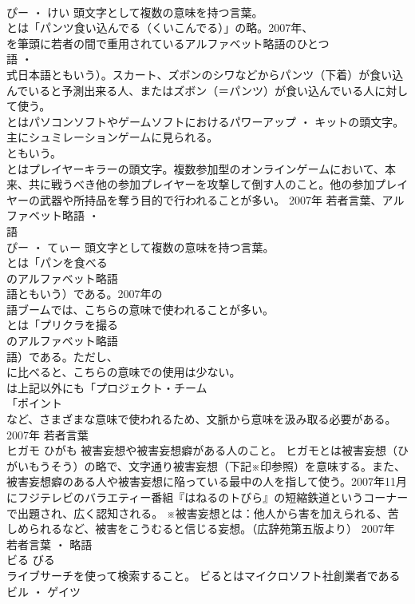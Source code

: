 \documentclass[8pt]{extreport}
\begin{document}
\begin{CJK}{UTF8}{min}
\\	ぴー ・ けい	頭文字として複数の意味を持つ言葉。	
\\	とは「パンツ食い込んでる（くいこんでる）」の略。2007年、
\\	を筆頭に若者の間で重用されているアルファベット略語のひとつ
\\	語 ・ 
\\	式日本語ともいう）。スカート、ズボンのシワなどからパンツ（下着）が食い込んでいると予測出来る人、またはズボン（＝パンツ）が食い込んでいる人に対して使う。 
\\	とはパソコンソフトやゲームソフトにおけるパワーアップ ・ キットの頭文字。主にシュミレーションゲームに見られる。
\\	ともいう。 
\\	とはプレイヤーキラーの頭文字。複数参加型のオンラインゲームにおいて、本来、共に戦うべき他の参加プレイヤーを攻撃して倒す人のこと。他の参加プレイヤーの武器や所持品を奪う目的で行われることが多い。	2007年	若者言葉、アルファベット略語 ・ 
\\	語	
\\	ぴー ・ てぃー	頭文字として複数の意味を持つ言葉。	
\\	とは「パンを食べる
\\	のアルファベット略語
\\	語ともいう）である。2007年の
\\	語ブームでは、こちらの意味で使われることが多い。 
\\	とは「プリクラを撮る
\\	のアルファベット略語
\\	語）である。ただし、
\\	に比べると、こちらの意味での使用は少ない。 
\\	は上記以外にも「プロジェクト・チーム
\\	「ポイント
\\	など、さまざまな意味で使われるため、文脈から意味を汲み取る必要がある。	2007年	若者言葉	
\\	ヒガモ	ひがも	被害妄想や被害妄想癖がある人のこと。	ヒガモとは被害妄想（ひがいもうそう）の略で、文字通り被害妄想（下記※印参照）を意味する。また、被害妄想癖のある人や被害妄想に陥っている最中の人を指して使う。2007年11月にフジテレビのバラエティー番組『はねるのトびら』の短縮鉄道というコーナーで出題され、広く認知される。 ※被害妄想とは：他人から害を加えられる、苦しめられるなど、被害をこうむると信じる妄想。（広辞苑第五版より）	2007年	若者言葉 ・ 略語	
\\	ビる	びる	
\\	ライブサーチを使って検索すること。	ビるとはマイクロソフト社創業者であるビル ・ ゲイツ

\end{CJK}
\end{document}

